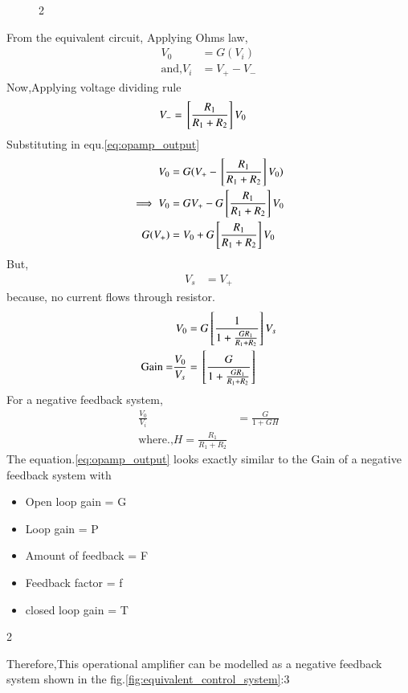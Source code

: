 \begin{enumerate}[label=\thesubsection.\arabic*.,ref=\thesubsection.\theenumi]
\begin{figure}[!ht]
\begin{center}
		\resizebox{\columnwidth}{!}{}
	\end{center}
\caption{2}
\label{fig:equivalent_circuit}
\end{figure}
From the equivalent circuit,
Applying Ohms law,
\begin{align}
V_0 &= G(V_i) \label{eq:opamp_output}\\
\text{and,} V_i &= V_+-V_-
\end{align}
Now,Applying voltage dividing rule
\begin{align}
V_- &= {}\left[\frac{R_1}{R_1+R_2}\right]V_0
\end{align}
Substituting in equ.\ref{eq:opamp_output}
\begin{align}
    V_0 &= G(V_+-{}\left[\frac{R_1}{R_1+R_2}\right]V_0)
    \\
\implies V_0 &= GV_+-G{}\left[\frac{R_1}{R_1+R_2}\right]V_0
    \\
G(V_+)&=V_0+G{}\left[\frac{R_1}{R_1+R_2}\right]V_0
\end{align}
But,
\begin{align}
    V_s &= V_+
\end{align}
because, no current flows through resistor.  
\begin{align}
    V_0 &= G{}\left[\frac{1}{1+\frac{GR_1}{R_1+R_2}}\right]V_s
    \\
 \text{Gain =}\frac{V_0}{V_s}&={}\left[\frac{G}{1+\frac{GR_1}{R_1+R_2}}\right]\label{eq:opamp_gain}
\end{align}
For a negative feedback system,
\begin{align}
   \frac{V_0}{V_i} &= \frac{G}{1+GH}
  \\
  \text{where.,} H = \frac{R_1}{R_1+R_2}
\end{align}
The equation.\ref{eq:opamp_output} looks exactly similar to the Gain of a negative feedback system with
\begin{itemize}
    \item Open loop gain = G
    \item Loop gain = P 
    \item Amount of feedback = F
    \item Feedback factor = f
    \item closed loop gain = T
\end{itemize}
\begin{table}[!ht]
\centering

\caption{2}
\label{table: Output_Table}
\end{table}
Therefore,This operational amplifier can be modelled as a negative feedback system shown in the fig.\ref{fig:equivalent_control_system}:3

\end{enumerate}
